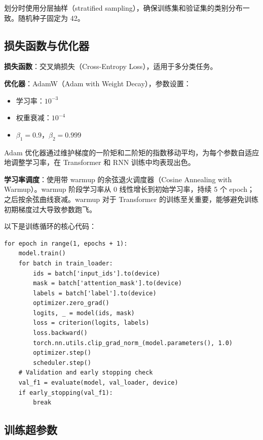 \documentclass[a4paper]{article}
\begin{document}
划分时使用分层抽样（stratified sampling），确保训练集和验证集的类别分布一致。随机种子固定为 42。

\subsection{损失函数与优化器}

\textbf{损失函数}：交叉熵损失（Cross-Entropy Loss），适用于多分类任务。

\textbf{优化器}：AdamW（Adam\cite{kingma2015adam} with Weight Decay），参数设置：
\begin{itemize}
    \item 学习率：$10^{-3}$
    \item 权重衰减：$10^{-4}$
    \item $\beta_1 = 0.9$，$\beta_2 = 0.999$
\end{itemize}

Adam\cite{kingma2015adam} 优化器通过维护梯度的一阶矩和二阶矩的指数移动平均，为每个参数自适应地调整学习率，在 Transformer 和 RNN 训练中均表现出色。

\textbf{学习率调度}：使用带 warmup 的余弦退火调度器（Cosine Annealing with Warmup）。warmup 阶段学习率从 0 线性增长到初始学习率，持续 5 个 epoch；之后按余弦曲线衰减。warmup 对于 Transformer\cite{vaswani2017attention} 的训练至关重要，能够避免训练初期梯度过大导致参数跑飞。

以下是训练循环的核心代码：

\begin{codebox}
\begin{lstlisting}[style=pyframe]
for epoch in range(1, epochs + 1):
    model.train()
    for batch in train_loader:
        ids = batch['input_ids'].to(device)
        mask = batch['attention_mask'].to(device)
        labels = batch['label'].to(device)
        optimizer.zero_grad()
        logits, _ = model(ids, mask)
        loss = criterion(logits, labels)
        loss.backward()
        torch.nn.utils.clip_grad_norm_(model.parameters(), 1.0)
        optimizer.step()
        scheduler.step()
    # Validation and early stopping check
    val_f1 = evaluate(model, val_loader, device)
    if early_stopping(val_f1):
        break
\end{lstlisting}
\end{codebox}

\subsection{训练超参数}
\end{document}
